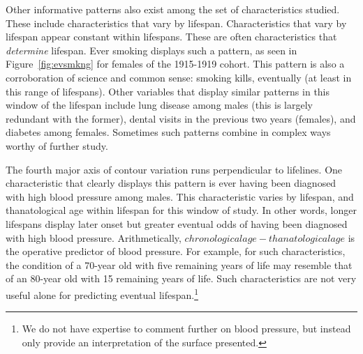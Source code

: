 \documentclass[11pt,oneside]{article} %
\begin{document}
Other informative patterns also exist among the set of characteristics studied.
These include characteristics that vary by lifespan. Characteristics that vary
by lifespan appear constant within lifespans. These are often characteristics that
\textit{determine} lifespan. Ever smoking displays such a pattern, as seen in
Figure~\ref{fig:evsmkng} for females of the 1915-1919 cohort. This pattern is
also a corroboration of science and common sense: smoking kills, eventually (at
least in this range of lifespans). Other variables that display similar patterns in this
window of the lifespan include lung disease among males (this is largely
redundant with the former), dental visits in the previous two years (females),
and diabetes among females. Sometimes such patterns combine in complex ways worthy of further study.

The fourth major axis of contour variation runs perpendicular to lifelines. One
characteristic that clearly displays this pattern is ever having been
diagnosed with high blood pressure among males. This characteristic varies by
lifespan, and thanatological age within lifespan for this window of study.
In other words, longer lifespans display later onset but greater eventual odds of
having been diagnosed with high blood pressure. Arithmetically, $chronological
age - thanatological age$ is the operative predictor of blood pressure. For
example, for such characteristics, the condition of a 70-year old with five
remaining years of life may resemble that of an 80-year old with
15 remaining years of life. Such characteristics are not very useful alone for predicting eventual
lifespan.\footnote{We do not have expertise to comment further on blood pressure, but instead only provide an interpretation of the surface presented.} 
\end{document}
